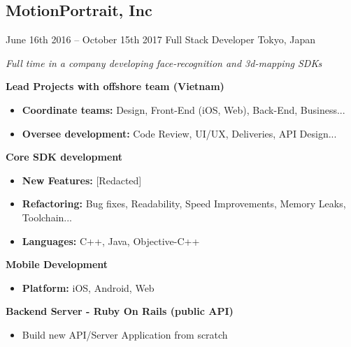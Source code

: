 \documentclass[]{template/friggeri-cv} %
\begin{document}
\subsection{MotionPortrait, Inc}
\begin{entrylist}


\entry
{June 16th 2016 -- October 15th 2017}
{Full Stack Developer}
{Tokyo, Japan}
{\emph{Full time in a company developing face-recognition and 3d-mapping SDKs}

\textbf{Lead Projects with offshore team (Vietnam)} 
\begin{itemize}
\item \textbf{Coordinate teams:} Design, Front-End (iOS, Web), Back-End, Business...
\item \textbf{Oversee development:} Code Review, UI/UX, Deliveries, API Design...
\end{itemize}
\textbf{Core SDK development} 
\begin{itemize}
\item \textbf{New Features:} [Redacted]
\item \textbf{Refactoring:} Bug fixes, Readability, Speed Improvements, Memory Leaks, Toolchain...
\item \textbf{Languages:} C++, Java, Objective-C++

\end{itemize}
\textbf{Mobile Development} 
\begin{itemize}
\item \textbf{Platform:} iOS, Android, Web
\end{itemize}

\textbf{Backend Server - Ruby On Rails (public API)} 
\begin{itemize}
\item Build new API/Server Application from scratch
\end{itemize}
}
\end{entrylist}



\end{document}
